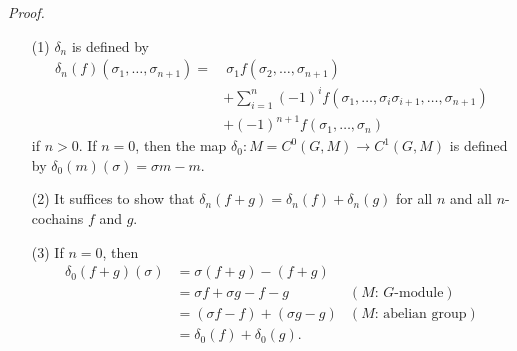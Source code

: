 \documentclass{article}
\begin{document}
\emph{Proof.}
\begin{enumerate}
\item[(1)]
  $\delta_n$ is defined by
  \begin{align*}
    \delta_n(f)(\sigma_1, \ldots, \sigma_{n+1})
    = & \:
    \sigma_1 f(\sigma_2, \ldots, \sigma_{n+1}) \\
    & + \sum_{i=1}^{n} (-1)^{i}
        f(\sigma_1, \ldots, \sigma_i \sigma_{i+1}, \ldots, \sigma_{n+1}) \\
    & + (-1)^{n+1} f(\sigma_1, \ldots, \sigma_{n})
  \end{align*}
  if $n > 0$.
  If $n = 0$, then the map $\delta_0: M = C^{0}(G,M) \to C^{1}(G,M)$ is defined by
  $\delta_0(m)(\sigma) = \sigma m - m$.

\item[(2)]
  It suffices to show that $\delta_n(f + g) = \delta_n(f) + \delta_n(g)$
  for all $n$ and all $n$-cochains $f$ and $g$.

\item[(3)]
  If $n = 0$, then
  \begin{align*}
    \delta_0(f + g)(\sigma)
    &= \sigma (f + g) - (f + g) \\
    &= \sigma f + \sigma g - f - g
      &(\text{$M$: $G$-module}) \\
    &= (\sigma f - f) +  (\sigma g - g)
      &(\text{$M$: abelian group}) \\
    &= \delta_0(f) + \delta_0(g).
  \end{align*}


\end{enumerate}
\end{document}
